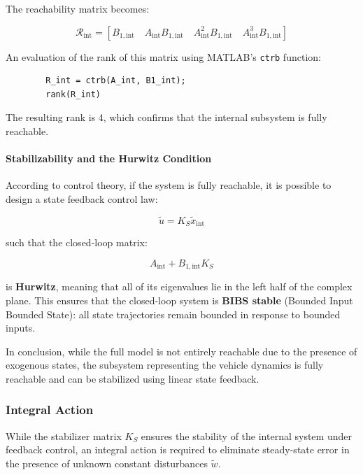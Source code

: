 \documentclass[]{report}
\begin{document}
	The reachability matrix becomes:
	
	
	\begin{equation}
		\mathcal{R}_{\text{int}} = \left[ B_{1,\text{int}} \quad A_{\text{int}}B_{1,\text{int}} \quad A_{\text{int}}^2B_{1,\text{int}} \quad A_{\text{int}}^3B_{1,\text{int}} \right]
	\end{equation}
	
	
	An evaluation of the rank of this matrix using MATLAB's \texttt{ctrb} function:
	
	\begin{verbatim}
		R_int = ctrb(A_int, B1_int);
		rank(R_int)
	\end{verbatim}
	
	The resulting rank is 4, which confirms that the internal subsystem is fully reachable.
	
	\paragraph{Stabilizability and the Hurwitz Condition}
	
	According to control theory, if the system is fully reachable, it is possible to design a state feedback control law:
	
\begin{equation}
	\tilde{u} = K_S \tilde{x}_{\text{int}}
\end{equation}

such that the closed-loop matrix:

\begin{equation}
	A_{\text{int}} + B_{1,\text{int}} K_S
\end{equation}

	
	is \textbf{Hurwitz}, meaning that all of its eigenvalues lie in the left half of the complex plane. This ensures that the closed-loop system is \textbf{BIBS stable} (Bounded Input Bounded State): all state trajectories remain bounded in response to bounded inputs.
	
	In conclusion, while the full model is not entirely reachable due to the presence of exogenous states, the subsystem representing the vehicle dynamics is fully reachable and can be stabilized using linear state feedback.
	
	
	\subsubsection{Integral Action}
	
	While the stabilizer matrix $K_S$ ensures the stability of the internal system under feedback control, an integral action is required to eliminate steady-state error in the presence of unknown constant disturbances $\tilde{w}$.
	
\end{document}
